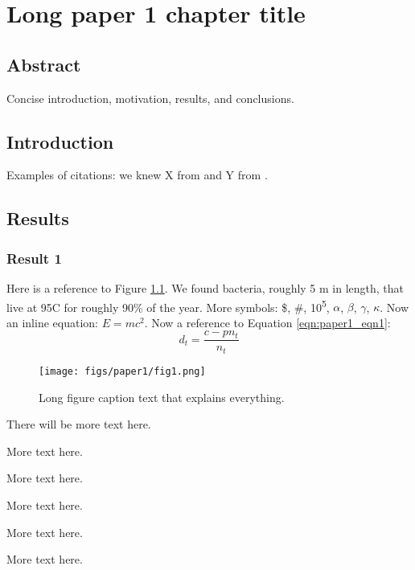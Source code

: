 \chapter{Long paper 1 chapter title}

\section{Abstract}
Concise introduction, motivation, results, and conclusions.

\section{Introduction}
Examples of citations: we knew X from \cite{Croote201616022} and Y from \cite{Croote20181306}.

\section{Results}
\subsection{Result 1}
Here is a reference to Figure \ref{fig:paper1_fig1}.
We found bacteria, roughly 5 \si{\mu}m in length, that live at 95\degree C for roughly 90\% of the year. More symbols: \$, \#, 10\textsuperscript{5}, $\alpha$, $\beta$, $\gamma$, $\kappa$. Now an inline equation: $E = mc^2$. Now a reference to Equation \ref{eqn:paper1_eqn1}:
\begin{equation}\label{eqn:paper1_eqn1}
d_t = \frac{c - pn_t}{n_t}
\end{equation}

\begin{figure}[hbt!]
\centering
\texttt{[image: figs/paper1/fig1.png]}
\caption[Short figure caption for List of Figures]{Long figure caption text that explains everything.}
\label{fig:paper1_fig1}
\end{figure}

There will be more text here.

More text here.

More text here.

More text here.

More text here.

More text here.

